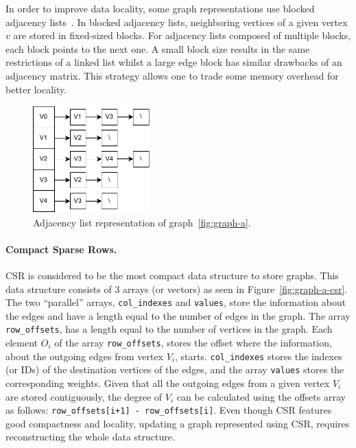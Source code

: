     In order to improve data locality, some graph representations use blocked adjacency lists~\cite{paper:faimgraph, paper:stinger}. In blocked adjacency lists, neighboring vertices of a given vertex $v$ are stored in fixed-sized blocks. For adjacency lists composed of multiple blocks, each block points to the next one. A small block size results in the same restrictions of a linked list whilst a large edge block has similar drawbacks of an adjacency matrix. This strategy allows one to trade some memory overhead for better locality. 

\begin{figure}[tbp]
  \centering
    \includegraphics[width=0.4\textwidth]{Chapters/Figures/Images/graph_a_list.pdf}
    \caption{Adjacency list representation of graph~\ref{fig:graph-a}.}
\label{fig:graph-a-list}
\end{figure}

    \paragraph{\textbf{Compact Sparse Rows}.} \gls{CSR} is considered to be the most compact data structure to store graphs. This data structure consists of 3 arrays (or vectors) as seen in Figure~\ref{fig:graph-a-csr}. The two ``parallel'' arrays, \texttt{col\_indexes} and \texttt{values}, store the information about the edges and have a length equal to the number of edges in the graph. The array \texttt{row\_offsets}, has a length equal to the number of vertices in the graph. Each element $O_i$ of the array \texttt{row\_offsets}, stores the offset where the information, about the outgoing edges from vertex $V_i$, starts. \texttt{col\_indexes} stores the indexes (or IDs) of the destination vertices of the edges, and the array \texttt{values} stores the corresponding weights. Given that all the outgoing edges from a given vertex $V_i$ are stored contiguously, the degree of $V_i$ can be calculated using the offsets array as follows: \texttt{row\_offsets[i+1] - row\_offsets[i]}. Even though \gls{CSR} features good compactness and locality, updating a graph represented using \gls{CSR}, requires reconstructing the whole data structure.

